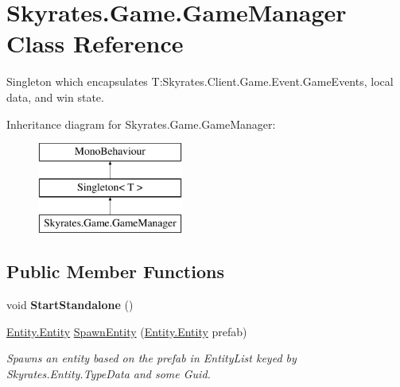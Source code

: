 \hypertarget{class_skyrates_1_1_game_1_1_game_manager}{\section{Skyrates.\-Game.\-Game\-Manager Class Reference}
\label{class_skyrates_1_1_game_1_1_game_manager}
}


Singleton which encapsulates T\-:\-Skyrates.\-Client.\-Game.\-Event.\-Game\-Events, local data, and win state.  


Inheritance diagram for Skyrates.\-Game.\-Game\-Manager\-:\begin{figure}[H]
\begin{center}
\leavevmode
\includegraphics[height=3.000000cm]{class_skyrates_1_1_game_1_1_game_manager}
\end{center}
\end{figure}
\subsection*{Public Member Functions}
\begin{DoxyCompactItemize}
\item 
\hypertarget{class_skyrates_1_1_game_1_1_game_manager_ae3fed923163af055769afcd09143116f}{void {\bfseries Start\-Standalone} ()}\label{class_skyrates_1_1_game_1_1_game_manager_ae3fed923163af055769afcd09143116f}

\item 
\hyperlink{class_skyrates_1_1_entity_1_1_entity}{Entity.\-Entity} \hyperlink{class_skyrates_1_1_game_1_1_game_manager_afb53958cc607ea8916771dbb9b8144f5}{Spawn\-Entity} (\hyperlink{class_skyrates_1_1_entity_1_1_entity}{Entity.\-Entity} prefab)
\begin{DoxyCompactList}\small\item\em Spawns an entity based on the prefab in Entity\-List keyed by Skyrates.\-Entity.\-Type\-Data and some Guid. \end{DoxyCompactList}\end{DoxyCompactItemize}
